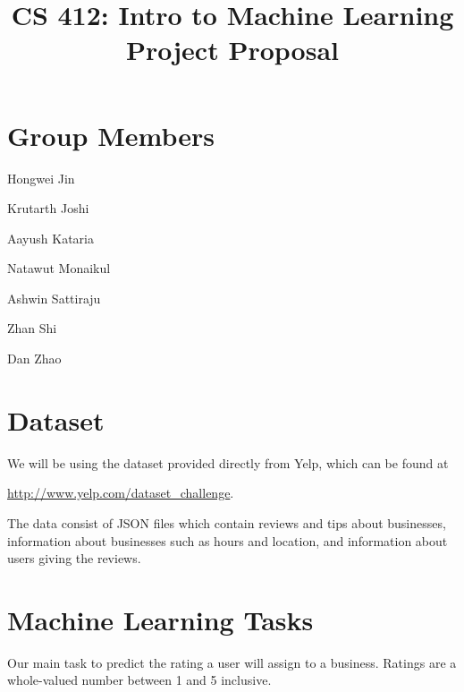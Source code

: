 \documentclass[12pt]{article}
\title{CS 412: Intro to Machine Learning\\Project Proposal}
\author{}
\date{}
\begin{document}
\maketitle

\section*{Group Members}
Hongwei Jin

\noindent Krutarth Joshi

\noindent Aayush Kataria

\noindent Natawut Monaikul

\noindent Ashwin Sattiraju

\noindent Zhan Shi

\noindent Dan Zhao

\section*{Dataset}
We will be using the dataset provided directly from Yelp, which can be found at

\begin{center}
\url{http://www.yelp.com/dataset_challenge}.
\end{center}

\noindent The data consist of JSON files which contain reviews and tips about businesses, information about businesses such as hours and location, and information about users giving the reviews.

\section*{Machine Learning Tasks}
Our main task to predict the rating a user will assign to a business. Ratings are a whole-valued number between 1 and 5 inclusive.
\end{document}
